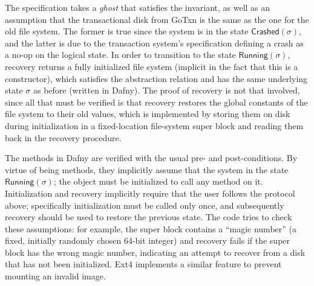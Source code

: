 The specification takes a \emph{ghost}  that satisfies the invariant, as
well as an assumption that the transactional disk from GoTxn is the same as the
one for the old file system. The former is true since the system is in the state
$\mathsf{Crashed}(\sigma)$, and the latter is due to the transaction system's
specification defining a crash as a no-op on the logical state. In order to
transition to the state $\mathsf{Running}(\sigma)$, recovery returns a fully
initialized file system (implicit in the fact that this is a constructor), which
satisfies the abstraction relation  and has the same underlying
state $\sigma$ as before (written  in Dafny). The proof of
recovery is not that involved, since all that must be verified is that recovery
restores the global constants of the file system to their old values, which is
implemented by storing them on disk during initialization in a fixed-location
file-system super block and reading them back in the recovery procedure.

The methods in Dafny are verified with the usual pre- and post-conditions. By
virtue of being methods, they implicitly assume that the system in the state
$\mathsf{Running}(\sigma)$; the  object must be initialized to call
any method on it. Initialization and recovery implicitly require that the user
follows the protocol above; specifically initialization must be called only
once, and subsequently recovery should be used to restore the previous state.
The code tries to check these assumptions: for example, the super block contains
a ``magic number'' (a fixed, initially randomly chosen 64-bit integer) and
recovery fails if the super block has the wrong magic number, indicating an
attempt to recover from a disk that has not been initialized. Ext4 implements a
similar feature to prevent mounting an invalid image.

